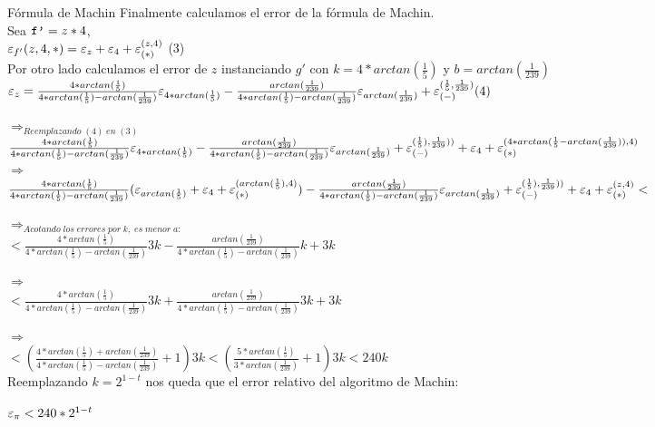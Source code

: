 \begin{subsection}{Fórmula de Machin}
	Finalmente calculamos el error de la fórmula de Machin.\\
	
	Sea $\texttt{f'}=z*4$,\\
	
	$\varepsilon _{f'}({z,4,*}) = \varepsilon _{z} + \varepsilon _{4} + \varepsilon _{({*})}^{({z,4})}$ (3)\\
	
	Por otro lado calculamos el error de $z$ instanciando $g'$ con $k=4*arctan(\frac{1}{5})$ y $b=arctan(\frac{1}{239})$\\
	
	$\varepsilon _{z} = \frac{4*arctan(\frac{1}{5})}{4*arctan(\frac{1}{5})-arctan(\frac{1}{239})}\varepsilon _{4*arctan(\frac{1}{5})} - \frac{arctan(\frac{1}{239})}{4*arctan(\frac{1}{5})-arctan(\frac{1}{239})}\varepsilon _{arctan(\frac{1}{239})} + \varepsilon _{({-})}^{({\frac{1}{5},\frac{1}{239}})} (4)$
	
	$\Rightarrow_{Reemplazando \; (4) \; en \; (3)}$\\
	
	$\frac{4*arctan(\frac{1}{5})}{4*arctan(\frac{1}{5})-arctan(\frac{1}{239})}\varepsilon _{4*arctan(\frac{1}{5})} - \frac{arctan(\frac{1}{239})}{4*arctan(\frac{1}{5})-arctan(\frac{1}{239})}\varepsilon _{arctan(\frac{1}{239})} + \varepsilon _{({-})}^{({\frac{1}{5}),\frac{1}{239})})} + \varepsilon _{4} + \varepsilon _{({*})}^{({4*arctan(\frac{1}{5}-arctan(\frac{1}{239})),4})}$\\
	
	$\Rightarrow$\\
	
	$\frac{4*arctan(\frac{1}{5})}{4*arctan(\frac{1}{5})-arctan(\frac{1}{239})}(\varepsilon _{arctan(\frac{1}{5})}+\varepsilon _{4}+\varepsilon _{({*})}^{({arctan(\frac{1}{5}),4})}) - \frac{arctan(\frac{1}{239})}{4*arctan(\frac{1}{5})-arctan(\frac{1}{239})}\varepsilon _{arctan(\frac{1}{239})} + \varepsilon _{({-})}^{({\frac{1}{5}),\frac{1}{239})})} + \varepsilon _{4} + \varepsilon _{({*})}^{({z,4})} < $
	
	$\Rightarrow_{Acotando \; los \; errores \; por \; k, \; es \; menor \; a:}$\\
	
	$< \frac{4*arctan(\frac{1}{5})}{4*arctan(\frac{1}{5})-arctan(\frac{1}{239})}3k - \frac{arctan(\frac{1}{239})}{4*arctan(\frac{1}{5})-arctan(\frac{1}{239})}k+3k $
	
	$\Rightarrow$\\
	
	$< \frac{4*arctan(\frac{1}{5})}{4*arctan(\frac{1}{5})-arctan(\frac{1}{239})}3k + \frac{arctan(\frac{1}{239})}{4*arctan(\frac{1}{5})-arctan(\frac{1}{239})}3k+3k $
	
	$\Rightarrow$\\
	
	$< (\frac{4*arctan(\frac{1}{5})+arctan(\frac{1}{239})}{4*arctan(\frac{1}{5})-arctan(\frac{1}{239})} + 1) 3k <  (\frac{5*arctan(\frac{1}{5})}{3*arctan(\frac{1}{239})} + 1)3k < 240k$\\
		
	Reemplazando $k=2^{1-t}$ nos queda que el error relativo del algoritmo de Machin:
	
		$\varepsilon _{\pi} < 240*2^{1-t}$
	
	
\end{subsection}
